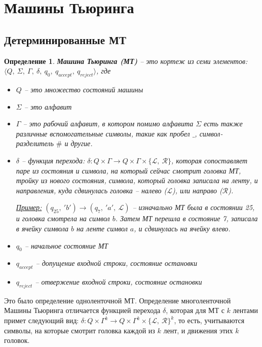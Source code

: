 \documentclass[a4paper,12pt]{article}
\newtheorem{definition}{Определение}
\newcommand{\example}{\underline{Пример:} }
\begin{document}
\tableofcontents
\newpage
\section{Машины Тьюринга}

\subsection{Детерминированные МТ}

\begin{definition}
\textbf{Машина Тьюринга (МТ)} -- это кортеж из семи элементов:\\ $\langle Q,\ \Sigma,\ \Gamma,\ \delta,\ q_0,\ q_{accept},\ q_{reject}\rangle$, где 
\begin{itemize}
    \item $Q$ -- это множество состояний машины
    \item $\Sigma$ -- это алфавит
    \item $\Gamma$ -- это рабочий алфавит, в котором помимо алфавита $\Sigma$ есть также различные вспомогательные символы, такие как пробел $\textbf{\_}$, символ-разделитель $\#$ и другие.
    \item $\delta$ -- функция перехода: $\delta : Q \times \Gamma \to Q \times \Gamma \times \big\{\mathcal{L},\ \mathcal{R}\big\}$, которая сопоставляет паре из состояния и символа, на который сейчас смотрит головка МТ, тройку из нового состояния, символа, который головка записала на ленту, и направления, куда сдвинулась головка -- налево ($\mathcal{L}$), или направо ($\mathcal{R}$). 
    
    \example{$(q_{25},\ 'b') \to (q_7,\ 'a',\ \mathcal{L})$ -- изначально МТ была в состоянии 25, и головка смотрела на символ $b$. Затем МТ перешла в состояние 7, записала в ячейку символа $b$ на ленте символ $a$, и сдвинулась на ячейку влево.}
    \item $q_0$ -- начальное состояние МТ
    \item $q_{accept}$ -- допущение входной строки, состояние остановки
    \item $q_{reject}$ -- отвержение входной строки, состояние остановки
\end{itemize}
\end{definition}

Это было определение одноленточной МТ. Определение многоленточной Машины Тьюринга отличается функцией перехода $\delta$, которая для МТ с $k$ лентами примет следующий вид: $\delta : Q\times \Gamma^k \to Q \times \Gamma^k \times \big\{\mathcal{L},\ \mathcal{R}\big\}^k$, то есть, учитываются символы, на которые смотрит головка каждой из $k$ лент, и движения этих $k$ головок. 
\end{document}
